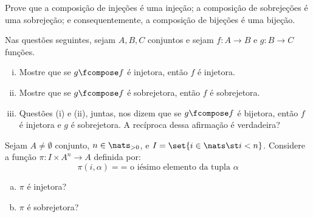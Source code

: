 \begin{exercise}
Prove que a composição de injeções é uma injeção; a composição de sobrejeções é uma sobrejeção; e consequentemente, a composição de bijeções é uma bijeção.
\end{exercise}

\begin{exercise}
Nas questões seguintes, sejam $A,B,C$ conjuntos e sejam $f:A \to B$ e $g:B \to C$ funções.
\begin{enumerate}[(i)]
    \item Mostre que se $g \fcompose f$ é injetora, então $f$ é injetora.
    \item Mostre que se $g \fcompose f$ é sobrejetora, então $f$ é sobrejetora.
    \item Questões (i) e (ii), juntas, nos dizem que se $g \fcompose f$ é bijetora, então $f$ é injetora e $g$ é sobrejetora. A recíproca dessa afirmação é verdadeira?
\end{enumerate}
\end{exercise}

\begin{exercise}
    Sejam $A \not = \emptyset$ conjunto, $n \in \nats_{>0}$, e $I = \set{i \in \nats \st i < n}$. Considere a função $\pi : I \times A^n \to A$ definida por:
    $$
        \pi (i, \alpha) = \text{= o iésimo elemento da tupla } \alpha
    $$

    \begin{enumerate}[(a)]
        \item $\pi$ é injetora?
        \item $\pi$ é sobrejetora?
    \end{enumerate}
\end{exercise}

